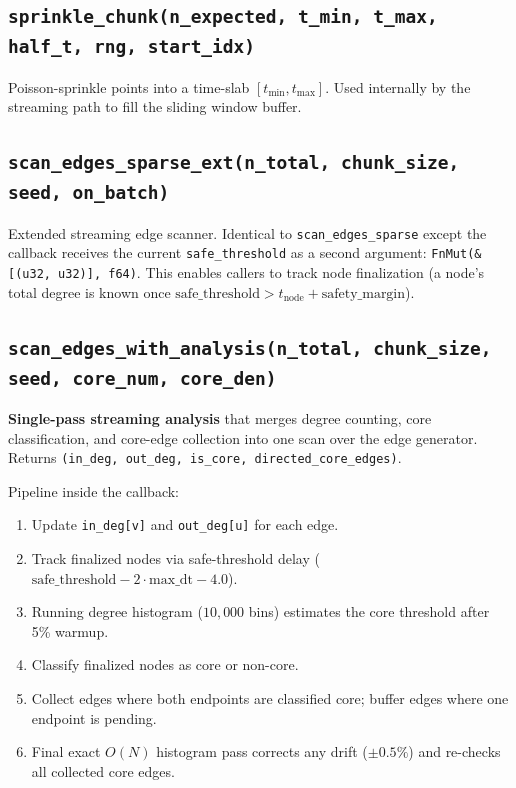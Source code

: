 \documentclass[11pt, a4paper, openany]{book}
\newcommand{\code}[1]{\texttt{#1}}
\newcommand{\func}[1]{\texttt{\color{structure}#1}}
\begin{document}
\subsection{\func{sprinkle\_chunk(n\_expected, t\_min, t\_max, half\_t, rng, start\_idx)}}

Poisson-sprinkle points into a time-slab $[t_{\min}, t_{\max}]$.  Used
internally by the streaming path to fill the sliding window buffer.

\subsection{\func{scan\_edges\_sparse\_ext(n\_total, chunk\_size, seed, on\_batch)}}

Extended streaming edge scanner.  Identical to \func{scan\_edges\_sparse} except
the callback receives the current \code{safe\_threshold} as a second argument:
\code{FnMut(\&[(u32, u32)], f64)}.  This enables callers to track node
finalization (a node's total degree is known once
$\text{safe\_threshold} > t_{\text{node}} + \text{safety\_margin}$).

\subsection{\func{scan\_edges\_with\_analysis(n\_total, chunk\_size, seed, core\_num, core\_den)}}

\textbf{Single-pass streaming analysis} that merges degree counting, core
classification, and core-edge collection into one scan over the edge generator.
Returns \code{(in\_deg, out\_deg, is\_core, directed\_core\_edges)}.

Pipeline inside the callback:
\begin{enumerate}
  \item Update \code{in\_deg[v]} and \code{out\_deg[u]} for each edge.
  \item Track finalized nodes via safe-threshold delay
        ($\text{safe\_threshold} - 2 \cdot \text{max\_dt} - 4.0$).
  \item Running degree histogram ($10{,}000$ bins) estimates the core threshold
        after 5\% warmup.
  \item Classify finalized nodes as core or non-core.
  \item Collect edges where both endpoints are classified core; buffer edges
        where one endpoint is pending.
  \item Final exact $O(N)$ histogram pass corrects any drift ($\pm 0.5\%$) and
        re-checks all collected core edges.
\end{enumerate}
\end{document}

